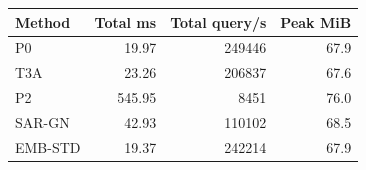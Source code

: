 \begin{tabular}{lrrr}
\toprule
Method & Total ms & Total query/s & Peak MiB \\
\midrule
P0 & 19.97 & 249446 & 67.9 \\
T3A & 23.26 & 206837 & 67.6 \\
P2 & 545.95 & 8451 & 76.0 \\
SAR-GN & 42.93 & 110102 & 68.5 \\
EMB-STD & 19.37 & 242214 & 67.9 \\
\bottomrule\end{tabular}
